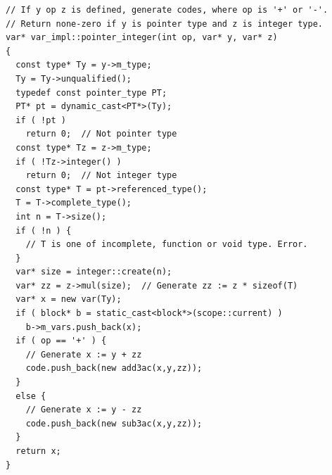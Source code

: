 \begin{verbatim}
// If y op z is defined, generate codes, where op is '+' or '-'.
// Return none-zero if y is pointer type and z is integer type.
var* var_impl::pointer_integer(int op, var* y, var* z)
{
  const type* Ty = y->m_type;
  Ty = Ty->unqualified();
  typedef const pointer_type PT;
  PT* pt = dynamic_cast<PT*>(Ty);
  if ( !pt )
    return 0;  // Not pointer type
  const type* Tz = z->m_type;
  if ( !Tz->integer() )
    return 0;  // Not integer type
  const type* T = pt->referenced_type();
  T = T->complete_type();
  int n = T->size();
  if ( !n ) {
    // T is one of incomplete, function or void type. Error.
  }
  var* size = integer::create(n);
  var* zz = z->mul(size);  // Generate zz := z * sizeof(T)
  var* x = new var(Ty);
  if ( block* b = static_cast<block*>(scope::current) )
    b->m_vars.push_back(x);
  if ( op == '+' ) {
    // Generate x := y + zz
    code.push_back(new add3ac(x,y,zz));
  }
  else {
    // Generate x := y - zz
    code.push_back(new sub3ac(x,y,zz));
  }
  return x;
}
\end{verbatim}

